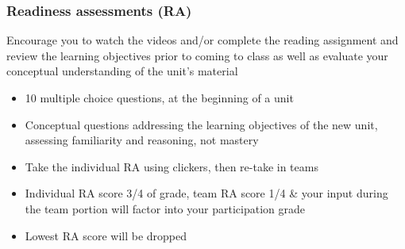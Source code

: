 \documentclass[slidestop,compress,mathserif,12pt,t,professionalfonts,xcolor=table]{beamer}
\begin{document}

\begin{frame}
\frametitle{Readiness assessments (RA)}

 Encourage you to watch the videos and/or complete the reading assignment and review the learning objectives prior to coming to class as well as evaluate your conceptual understanding of the unit's material

\begin{itemize}

\item 10 multiple choice questions, at the beginning of a unit

\item Conceptual questions addressing the learning objectives of the new unit, assessing familiarity and reasoning, not mastery

\item Take the individual RA using clickers, then re-take in teams

\item Individual RA score 3/4 of grade, team RA score 1/4 \& your input during the team portion will factor into your participation grade

\item Lowest RA score will be dropped

\end{itemize}


\end{frame}

\end{document}

